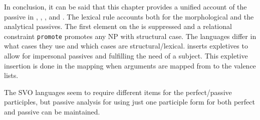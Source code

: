 In conclusion, it can be said that this chapter provides a unified account of the passive in ,
, , and . The lexical rule accounts both for the morphological and the
analytical passives. The first element on the \argstl is suppressed and a relational constraint
\texttt{promote} promotes any NP with structural case. The languages differ in what cases they use and
which cases are structural/lexical.  inserts expletives to allow for impersonal passives and
fulfilling the need of a subject. This expletive insertion is done in the \argst mapping when
arguments are mapped from \argst to the valence lists.

The SVO languages seem to require different items for the perfect/passive participles, but 
passive analysis for  using just one participle form for both perfect and passive can be maintained.




